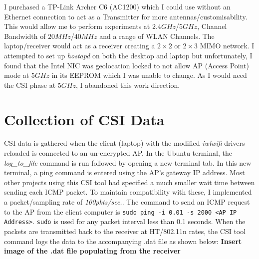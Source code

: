 I purchased a TP-Link Archer C6 (AC1200) which I could use without an Ethernet connection to act as a Transmitter for more antennas/customisability. This would allow me to perform experiments at $2.4GHz$/$5GHz$, Channel Bandwidth of $20MHz$/$40MHz$ and a range of WLAN Channels. The laptop/receiver would act as a receiver creating a $2\times 2$ or $2\times 3$ MIMO network. I attempted to set up \textit{hostapd} on both the desktop and laptop but unfortunately, I found that the Intel NIC was geolocation locked to not allow AP (Access Point) mode at $5GHz$ in its EEPROM which I was unable to change. As I would need the CSI phase at $5GHz$, I abandoned this work direction. 
\section{Collection of CSI Data}
CSI data is gathered when the client (laptop) with the modified \textit{iwlwifi} drivers reloaded is connected to an un-encrypted AP. In the Ubuntu terminal, the \textit{log\_to\_file} command is run followed by opening a new terminal tab. In this new terminal, a ping command is entered using the AP's gateway IP address. Most other projects using this CSI tool had specified a much smaller wait time between sending each ICMP packet. To maintain compatibility with these, I implemented a packet/sampling rate of \textit{100pkts/sec.}. The command to send an ICMP request to the AP from the client computer is \lstinline{sudo ping -i 0.01 -s 2000 <AP IP Address>}. \lstinline{sudo} is used for any packet interval less than 0.1 seconds. When the packets are transmitted back to the receiver at HT/802.11n rates, the CSI tool command logs the data to the accompanying .dat file as shown below:
\textbf{Insert image of the .dat file populating from the receiver}

